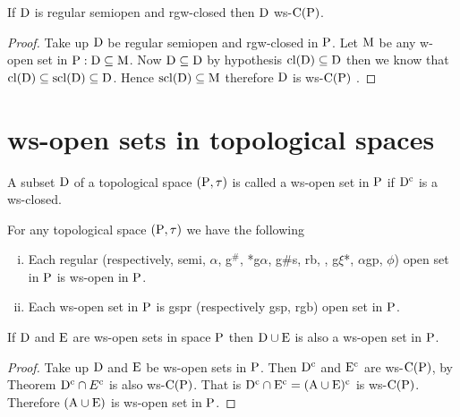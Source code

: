 \begin{thm}\label{thm2.2.47}
If $\mathrm{D}$ is regular semiopen and rgw-closed then $\mathrm{D}$ ws-$\mathrm{C}(\mathrm{P})$.
\end{thm}

\begin{proof}
Take up $\mathrm{D}$ be regular semiopen and rgw-closed in $\mathrm{P}$. Let $\mathrm{M}$ be any w-open set in $\mathrm{P} : \mathrm{D}\subseteq \mathrm{M}$. Now $\mathrm{D}\subseteq \mathrm{D}$ by hypothesis $\mathrm{cl}(\mathrm{D})\subseteq \mathrm{D}$ then we know that $\mathrm{cl}(\mathrm{D}) \subseteq \mathrm{scl}(\mathrm{D})\subseteq \mathrm{D}$. Hence $\mathrm{scl}(\mathrm{D})\subseteq \mathrm{M}$ therefore $\mathrm{D}$ is ws-$\mathrm{C}(\mathrm{P})$ .
\end{proof}

\section{ws-open sets in topological spaces}

\begin{dfn}\label{defi2.3.1}
A subset $\mathrm{D}$ of a topological space $(\mathrm{P},\tau)$ is called a ws-open set in $\mathrm{P}$ if $\mathrm{D}^{\text{c}}$ is a ws-closed.
\end{dfn}

\begin{thm}\label{thm2.3.2}
For any topological space $(\mathrm{P},\tau)$ we have the following
\begin{enumerate}[(i)]
\item Each regular (respectively, semi, $\alpha$, g$^{\#}$, *g$\alpha$, g\#s, rb, , g$\xi$*, $\alpha$gp, $\phi$) open set in $\mathrm{P}$ is ws-open in $\mathrm{P}$.

\item Each ws-open set in $\mathrm{P}$ is gspr (respectively gsp, rgb) open set in $\mathrm{P}$.
\end{enumerate}
\end{thm}

\begin{thm}\label{thm2.3.3}
If $\mathrm{D}$ and $\mathrm{E}$  are ws-open sets in space $\mathrm{P}$ then $\mathrm{D}\cup \mathrm{E}$  is also a ws-open set in $\mathrm{P}$.
\end{thm}

\begin{proof}
Take up $\mathrm{D}$ and $\mathrm{E}$ be ws-open sets in $\mathrm{P}$. Then $\mathrm{D}^{\text{c}}$ and $\mathrm{E}^{\text{c}}$ are ws-$\mathrm{C}(\mathrm{P})$, by Theorem  $\mathrm{D}^{\text{c}} \cap E^{\text{c}}$ is also ws-$\mathrm{C}(\mathrm{P})$. That is $\mathrm{D}^{\text{c}} \cap \mathrm{E}^{\text{c}} = (\mathrm{A}\cup \mathrm{E})^{\text{c}}$ is ws-$\mathrm{C}(\mathrm{P})$. Therefore $(\mathrm{A}\cup \mathrm{E})$ is ws-open set in $\mathrm{P}$.
\end{proof}

